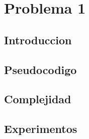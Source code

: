\section{Problema 1}


\subsection{Introduccion}
\subsection{Pseudocodigo}
\subsection{Complejidad}
\subsection{Experimentos}